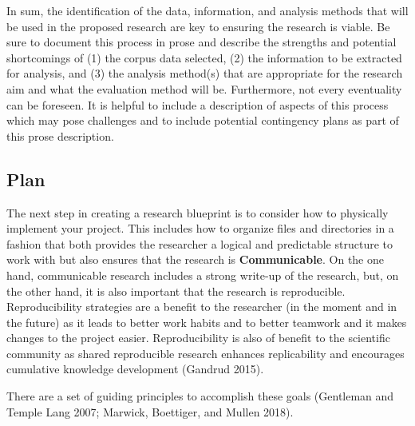 \documentclass[
  letterpaper,
]{latex/krantz}
\begin{document}
In sum, the identification of the data, information, and analysis
methods that will be used in the proposed research are key to ensuring
the research is viable. Be sure to document this process in prose and
describe the strengths and potential shortcomings of (1) the corpus data
selected, (2) the information to be extracted for analysis, and (3) the
analysis method(s) that are appropriate for the research aim and what
the evaluation method will be. Furthermore, not every eventuality can be
foreseen. It is helpful to include a description of aspects of this
process which may pose challenges and to include potential contingency
plans as part of this prose description.

\hypertarget{plan}{%
\subsection{Plan}\label{plan}}

The next step in creating a research blueprint is to consider how to
physically implement your project. This includes how to organize files
and directories in a fashion that both provides the researcher a logical
and predictable structure to work with but also ensures that the
research is \textbf{Communicable}. On the one hand, communicable
research includes a strong write-up of the research, but, on the other
hand, it is also important that the research is reproducible.
Reproducibility strategies are a benefit to the researcher (in the
moment and in the future) as it leads to better work habits and to
better teamwork and it makes changes to the project easier.
Reproducibility is also of benefit to the scientific community as shared
reproducible research enhances replicability and encourages cumulative
knowledge development (Gandrud 2015).

There are a set of guiding principles to accomplish these goals
(Gentleman and Temple Lang 2007; Marwick, Boettiger, and Mullen 2018).
\end{document}
